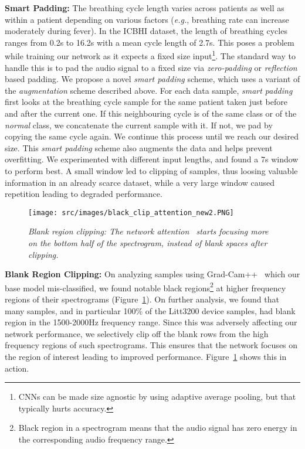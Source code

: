 \documentclass{article}
\begin{document}
\smallskip\noindent\textbf{Smart Padding:}
The breathing cycle length varies across patients as well as within a patient depending on various factors (\textit{e.g.}, breathing rate can increase moderately during fever).
In the ICBHI dataset, the length of breathing cycles ranges from 0.2s to 16.2s with a mean cycle length of 2.7s.
This poses a problem while training our network as it expects a fixed size input\footnote{CNNs can be made size agnostic by using adaptive average pooling, but that typically hurts accuracy.}. The standard way to handle this is to pad the audio signal to a fixed size via \textit{zero-padding} or \textit{reflection} based padding. We propose a novel \textit{smart padding} scheme, which uses a variant of the \textit{augmentation} scheme described above.
For each data sample, \textit{smart padding} first looks at the breathing cycle sample for the same patient taken just before and after the current one. If this neighbouring cycle is of the same class or of the \textit{normal} class, we concatenate the current sample with it. If not, we pad by copying the same cycle again. We continue this process until we reach our desired size. This \textit{smart padding} scheme also augments the data and helps prevent overfitting. We experimented with different input lengths, and found a 7s window to perform best. A small window led to clipping of samples, thus loosing valuable information in an already scarce dataset, while a very large window caused repetition leading to degraded performance.

\begin{figure}[!hbtp]
\begin{center}
    \centering
    \texttt{[image: src/images/black\_clip\_attention\_new2.PNG]}
\end{center}
\vspace{-5mm}
    \caption{\textit{Blank region clipping: The network attention~\cite{gradcampp} starts focusing more on the bottom half of the spectrogram, instead of blank spaces after clipping.}}
    \label{fig:black_clip}
\end{figure}

\noindent\textbf{Blank Region Clipping:}
On analyzing samples using Grad-Cam++~\cite{gradcampp} which our base model mis-classified, we found notable black regions\footnote{Black region in a spectrogram means that the audio signal has zero energy in the corresponding audio frequency range.} at higher frequency regions of their spectrograms (Figure~\ref{fig:black_clip}). On further analysis, we found that many samples, and in particular 100\% of the Litt3200 device samples, had blank region in the 1500-2000Hz frequency range. Since this was adversely affecting our network performance, we selectively clip off the blank rows from the high frequency regions of such spectrograms. This ensures that the network focuses on the region of interest leading to improved performance. Figure~\ref{fig:black_clip} shows this in action.
\end{document}
